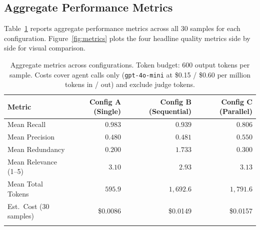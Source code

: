 \documentclass[pdflatex,sn-mathphys-num]{sn-jnl}
\theoremstyle{thmstyleone}
\theoremstyle{thmstyletwo}
\theoremstyle{thmstylethree}
\begin{document}
\subsection{Aggregate Performance Metrics}

Table~\ref{tab:main} reports aggregate performance metrics across all 30 samples for each configuration. Figure~\ref{fig:metrics} plots the four headline quality metrics side by side for visual comparison.

\begin{table}[ht]
\caption{Aggregate metrics across configurations. Token budget: 600 output tokens per sample. Costs cover agent calls only (\texttt{gpt-4o-mini} at \$0.15 / \$0.60 per million tokens in / out) and exclude judge tokens.}
\label{tab:main}
\begin{tabular}{@{}lrrr@{}}
\toprule
Metric & Config A (Single) & Config B (Sequential) & Config C (Parallel) \\
\midrule
Mean Recall          & $0.983$ & $0.939$ & $0.806$ \\
Mean Precision       & $0.480$ & $0.481$ & $0.550$ \\
Mean Redundancy      & $0.200$ & $1.733$ & $0.300$ \\
Mean Relevance (1--5) & $3.10$  & $2.93$  & $3.13$ \\
Mean Total Tokens     & $595.9$ & $1{,}692.6$ & $1{,}791.6$ \\
Est.\ Cost (30 samples) & \$0.0086 & \$0.0149 & \$0.0157 \\
\botrule
\end{tabular}
\end{table}
\end{document}
